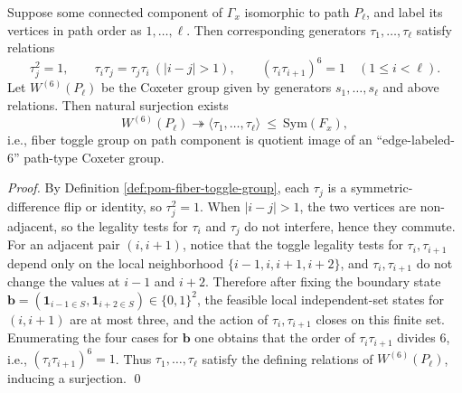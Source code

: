 \begin{theorem}\label{thm:pom-toggle-coxeter-relations-path}
Suppose some connected component of \(\Gamma_x\) isomorphic to path \(P_{\ell}\), and label its vertices in path order as \(1,\dots,\ell\).
Then corresponding generators \(\tau_1,\dots,\tau_{\ell}\) satisfy relations
\[
\tau_j^2=1,\qquad
\tau_i\tau_j=\tau_j\tau_i\ (|i-j|>1),\qquad
(\tau_i\tau_{i+1})^{6}=1\quad(1\le i<\ell).
\]
Let \(W^{(6)}(P_\ell)\) be the Coxeter group given by generators \(s_1,\dots,s_\ell\) and above relations.
Then natural surjection exists
\[
W^{(6)}(P_\ell)\twoheadrightarrow \langle \tau_1,\dots,\tau_{\ell}\rangle\ \le\ \mathrm{Sym}(F_x),
\]
i.e., fiber toggle group on path component is quotient image of an ``edge-labeled-6'' path-type Coxeter group.
\end{theorem}
\begin{proof}
By Definition \ref{def:pom-fiber-toggle-group}, each \(\tau_j\) is a symmetric-difference flip or identity, so \(\tau_j^2=1\).
When \(|i-j|>1\), the two vertices are non-adjacent, so the legality tests for \(\tau_i\) and \(\tau_j\) do not interfere, hence they commute.
For an adjacent pair \((i,i+1)\), notice that the toggle legality tests for \(\tau_i,\tau_{i+1}\) depend only on the local neighborhood
\(\{i-1,i,i+1,i+2\}\), and \(\tau_i,\tau_{i+1}\) do not change the values at \(i-1\) and \(i+2\).
Therefore after fixing the boundary state \(\mathbf b=(\mathbf 1_{i-1\in S},\mathbf 1_{i+2\in S})\in\{0,1\}^2\),
the feasible local independent-set states for \((i,i+1)\) are at most three, and the action of \(\tau_i,\tau_{i+1}\) closes on this finite set.
Enumerating the four cases for \(\mathbf b\) one obtains that the order of \(\tau_i\tau_{i+1}\) divides \(6\), i.e., \((\tau_i\tau_{i+1})^6=1\).
Thus \(\tau_1,\dots,\tau_\ell\) satisfy the defining relations of \(W^{(6)}(P_\ell)\), inducing a surjection. \qed
\end{proof}

